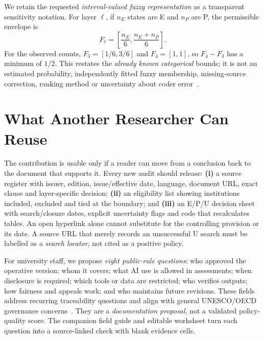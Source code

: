 \documentclass[conference,letterpaper]{IEEEtran}
\begin{document}
We retain the requested \emph{interval-valued fuzzy representation} as a transparent sensitivity notation. For layer $\ell$, if $n_E$ states are E and $n_P$ are P, the permissible envelope is
\begin{equation}\label{eq:fuzzy}
F_{\ell}=\left[\frac{n_E}{6},\frac{n_E+n_P}{6}\right].
\end{equation}
For the observed counts, $F_3=[1/6,3/6]$ and $F_4=[1,1]$, so $F_4-F_3$ has a minimum of $1/2$. This restates the \emph{already known categorical} bounds; it is not an estimated probability, independently fitted fuzzy membership, missing-source correction, ranking method or uncertainty about coder error~\cite{petry,pekala}.

\section{What Another Researcher Can Reuse}
The contribution is usable only if a reader can move from a conclusion back to the document that supports it. Every new audit should release: \textbf{(i)} a source register with issuer, edition, issue/effective date, language, document URL, exact clause and layer-specific decision; \textbf{(ii)} an eligibility list showing institutions included, excluded and tied at the boundary; and \textbf{(iii)} an E/P/U decision sheet with search/closure dates, explicit uncertainty flags and code that recalculates tables. An open hyperlink alone cannot substitute for the controlling provision or its date. A source URL that merely records an unsuccessful U search must be labelled as a \emph{search locator}, not cited as a positive policy.

For university staff, we propose \emph{eight public-rule questions}: who approved the operative version; whom it covers; what AI use is allowed in assessments; when disclosure is required; which tools or data are restricted; who verifies outputs; how fairness and appeals work; and who maintains future revisions. These fields address recurring traceability questions and align with general UNESCO/OECD governance concerns~\cite{unesco,oecd}. They are a \emph{documentation proposal}, not a validated policy-quality score. The companion field guide and editable worksheet turn each question into a source-linked check with blank evidence cells.
\end{document}
